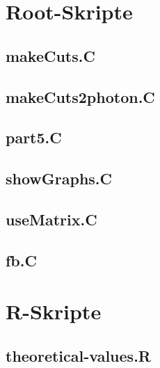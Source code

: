 \section{Root-Skripte}
\label{sec:root}
\subsection*{makeCuts.C}

\subsection*{makeCuts2photon.C}

\subsection*{part5.C}

\subsection*{showGraphs.C}

\subsection*{useMatrix.C}

\subsection*{fb.C}


\newpage
\section{R-Skripte}
\label{sec:r}
\subsection*{theoretical-values.R}

